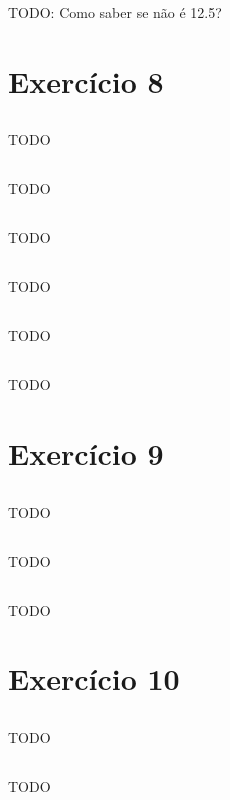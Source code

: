 \documentclass{article}
\begin{document}
TODO: Como saber se não é 12.5? 

\section{Exercício 8}
\subsection{}
TODO
\subsection{}
TODO
\subsection{}
TODO
\subsection{}
TODO
\subsection{}
TODO
\subsection{}
TODO

\section{Exercício 9}
\subsection{}
TODO
\subsection{}
TODO
\subsection{}
TODO

\section{Exercício 10}
\subsection{}
TODO
\subsection{}
TODO
\end{document}
